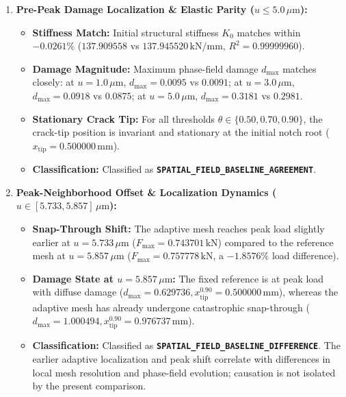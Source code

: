 \begin{enumerate}
  \item \textbf{Pre-Peak Damage Localization \& Elastic Parity ($u \le 5.0\,\mu\mathrm{m}$):}
  \begin{itemize}
    \item \textbf{Stiffness Match:} Initial structural stiffness $K_0$ matches within $\mathbf{-0.0261\%}$ ($137.909558$ vs $137.945520\,\mathrm{kN/mm}$, $R^2 = 0.99999960$).
    \item \textbf{Damage Magnitude:} Maximum phase-field damage $d_{\max}$ matches closely: at $u=1.0\,\mu\mathrm{m}$, $d_{\max} = 0.0095$ vs $0.0091$; at $u=3.0\,\mu\mathrm{m}$, $d_{\max} = 0.0918$ vs $0.0875$; at $u=5.0\,\mu\mathrm{m}$, $d_{\max} = 0.3181$ vs $0.2981$.
    \item \textbf{Stationary Crack Tip:} For all thresholds $\theta \in \{0.50, 0.70, 0.90\}$, the crack-tip position is invariant and stationary at the initial notch root ($x_{\mathrm{tip}} = 0.500000\,\mathrm{mm}$).
    \item \textbf{Classification:} Classified as \textbf{\texttt{SPATIAL\_FIELD\_BASELINE\_AGREEMENT}}.
  \end{itemize}

  \item \textbf{Peak-Neighborhood Offset \& Localization Dynamics ($u \in [5.733, 5.857]\,\mu\mathrm{m}$):}
  \begin{itemize}
    \item \textbf{Snap-Through Shift:} The adaptive mesh reaches peak load slightly earlier at $u = 5.733\,\mu\mathrm{m}$ ($F_{\max} = 0.743701\,\mathrm{kN}$) compared to the reference mesh at $u = 5.857\,\mu\mathrm{m}$ ($F_{\max} = 0.757778\,\mathrm{kN}$, a $-1.8576\%$ load difference).
    \item \textbf{Damage State at $u=5.857\,\mu\mathrm{m}$:} The fixed reference is at peak load with diffuse damage ($d_{\max} = 0.629736, x_{\mathrm{tip}}^{0.90} = 0.500000\,\mathrm{mm}$), whereas the adaptive mesh has already undergone catastrophic snap-through ($d_{\max} = 1.000494, x_{\mathrm{tip}}^{0.90} = 0.976737\,\mathrm{mm}$).
    \item \textbf{Classification:} Classified as \textbf{\texttt{SPATIAL\_FIELD\_BASELINE\_DIFFERENCE}}. The earlier adaptive localization and peak shift correlate with differences in local mesh resolution and phase-field evolution; causation is not isolated by the present comparison.
  \end{itemize}


\end{enumerate}
